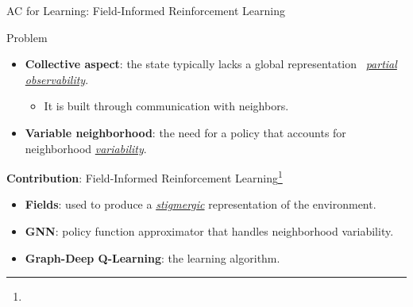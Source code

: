 \documentclass[presentation, 8pt,169]{beamer}\mode<presentation>{\usetheme{AMSBolognaFC}}
\begin{document}
\begin{frame}{AC for Learning: Field-Informed Reinforcement Learning}

  \begin{block}{Problem}
    \begin{itemize}
      \item \textbf{Collective aspect}: the state typically lacks a global representation \faArrowRight \, \emph{\underline{partial observability}}.
        \begin{itemize}
          \item It is built through communication with neighbors.
        \end{itemize}
      \item \textbf{Variable neighborhood}: the need for a policy that accounts for neighborhood \emph{\underline{variability}}.

    \end{itemize}
  \end{block}

  \begin{alertblock}{\textbf{Contribution}: Field-Informed Reinforcement Learning\footnote[frame]{}} 
    \begin{itemize}
      \item \textbf{Fields}: used to produce a \emph{\underline{stigmergic}} representation of the environment.
      \item \textbf{GNN}: policy function approximator that handles neighborhood variability.
      \item \textbf{Graph-Deep Q-Learning}: the learning algorithm.
    \end{itemize}
  \end{alertblock}

\end{frame}
\end{document}
